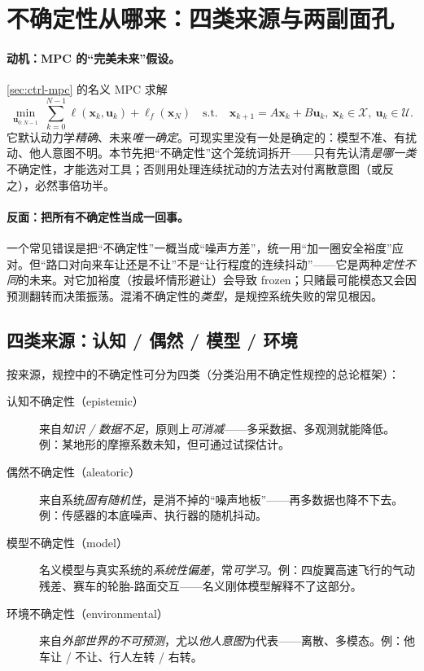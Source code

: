 \section{不确定性从哪来：四类来源与两副面孔}
\label{sec:pr-uncertainty}

\paragraph{动机：MPC 的“完美未来”假设。}
\cref{sec:ctrl-mpc} 的名义 MPC 求解
\begin{equation}
  \min_{\mathbf{u}_{0:N-1}}\ \sum_{k=0}^{N-1}\ell(\mathbf{x}_k,\mathbf{u}_k)+\ell_f(\mathbf{x}_N)\quad\text{s.t.}\quad \mathbf{x}_{k+1}=A\mathbf{x}_k+B\mathbf{u}_k,\ \mathbf{x}_k\in\mathcal{X},\ \mathbf{u}_k\in\mathcal{U}.
  \label{eq:pr-nominal-mpc}
\end{equation}
它默认动力学\emph{精确}、未来\emph{唯一确定}。可现实里没有一处是确定的：模型不准、有扰动、他人意图不明。本节先把“不确定性”这个笼统词拆开——只有先认清\emph{是哪一类}不确定性，才能选对工具；否则用处理连续扰动的方法去对付离散意图（或反之），必然事倍功半。

\paragraph{反面：把所有不确定性当成一回事。}
一个常见错误是把“不确定性”一概当成“噪声方差”，统一用“加一圈安全裕度”应对。但“路口对向来车让还是不让”不是“让行程度的连续抖动”——它是两种\emph{定性不同}的未来。对它加裕度（按最坏情形避让）会导致 frozen；只赌最可能模态又会因预测翻转而决策振荡。混淆不确定性的\emph{类型}，是规控系统失败的常见根因。

\subsection{四类来源：认知 / 偶然 / 模型 / 环境}
\label{sec:pr-unc-types}

按来源，规控中的不确定性可分为四类（分类沿用不确定性规控的总论框架）：

\begin{description}
  \item[认知不确定性（epistemic）] 来自\emph{知识 / 数据不足}，原则上\emph{可消减}——多采数据、多观测就能降低。例：某地形的摩擦系数未知，但可通过试探估计。
  \item[偶然不确定性（aleatoric）] 来自系统\emph{固有随机性}，是消不掉的“噪声地板”——再多数据也降不下去。例：传感器的本底噪声、执行器的随机抖动。
  \item[模型不确定性（model）] 名义模型与真实系统的\emph{系统性偏差}，常\emph{可学习}。例：四旋翼高速飞行的气动残差、赛车的轮胎-路面交互——名义刚体模型解释不了这部分。
  \item[环境不确定性（environmental）] 来自\emph{外部世界的不可预测}，尤以\emph{他人意图}为代表——离散、多模态。例：他车让 / 不让、行人左转 / 右转。
\end{description}


